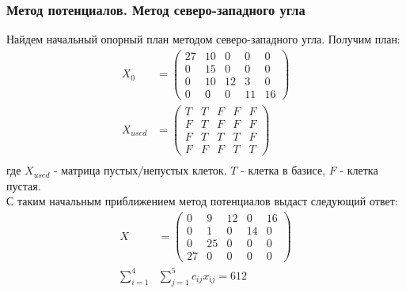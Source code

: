 \subsubsection{Метод потенциалов. Метод северо-западного угла}
Найдем начальный опорный план методом северо-западного угла. Получим план:
\begin{align*}
	X_0 &=
		\begin{pmatrix} 
			27 & 10 & 0 & 0 & 0 \\ 
			0 & 15 & 0 & 0 & 0 \\ 
			0 & 10 & 12 & 3 & 0 \\ 
			0 & 0 & 0 & 11 & 16
		\end{pmatrix} \\
	X_{used} &=
		\begin{pmatrix} 
			T & T & F & F & F \\ 
			F & T & F & F & F \\ 
			F & T & T & T & F \\ 
			F & F & F & T & T
		\end{pmatrix} \\
\end{align*}
где $X_{used}$ - матрица пустых/непустых клеток. $T$ - клетка в базисе, $F$ - клетка пустая. \\
С таким начальным приближением метод потенциалов выдаст следующий ответ:
\begin{align*}
	X &=
		\begin{pmatrix} 
			0 & 9 & 12 & 0 & 16 \\ 
			0 & 1 & 0 & 14 & 0 \\ 
			0 & 25 & 0 & 0 & 0 \\ 
			27 & 0 & 0 & 0 & 0
		\end{pmatrix} \\
	\sum_{i=1}^4 &\sum_{j=1}^5 c_{ij} x_{ij} = 612
\end{align*}


